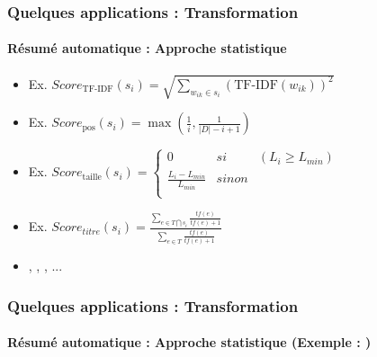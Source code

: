 \documentclass[xcolor=table]{beamer}
\begin{document}
\begin{frame}
	\frametitle{Quelques applications : Transformation}
	\framesubtitle{Résumé automatique : Approche statistique}
	
	\begin{itemize}
		\item {} 
		
		\hspace{.5cm}Ex. $Score_\text{TF-IDF}(s_i) = \sqrt{\sum\limits_{w_{ik} \in s_i} (\text{TF-IDF}(w_{ik}))^2}$
		
		\item {}
		
		\hspace{.5cm}Ex. $ Score_\text{pos}(s_i) = \max (\frac{1}{i}, \frac{1}{|D| - i + 1}) $
		
		\item {}
		
		\hspace{.5cm}Ex. $ Score_\text{taille}(s_i) = \left\lbrace 
		\begin{array}{lll}
		0 & si & (L_i \geq L_{min}) \\
		\frac{L_i - L_{min}}{L_{min}} & sinon & \\
		\end{array}
		\right. $
		
		\item {}
		
		\hspace{.5cm}Ex. $ Score_{titre}(s_i) = \frac{\sum_{e \in T \bigcap s_i}{\frac{tf(e)}{tf(e)+1}}}
		{\sum_{e \in T}{\frac{tf(e)}{tf(e)+1}}} $
		
		\item {}, , , ...
	\end{itemize}
\end{frame}

\begin{frame}
	\frametitle{Quelques applications : Transformation}
	\framesubtitle{Résumé automatique : Approche statistique (Exemple : \cite{13-aries-al})}
	
	
\end{frame}
\end{document}
